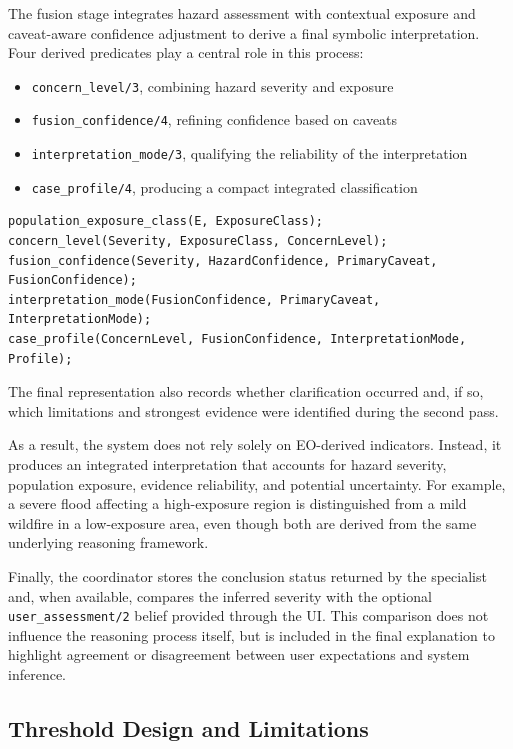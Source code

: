 \documentclass[12pt]{article}
\let\oldtexttt\texttt
\renewcommand{\texttt}[1]{{\fontsize{10.5}{12}\selectfont\oldtexttt{#1}}}
\begin{document}
The fusion stage integrates hazard assessment with contextual exposure and caveat-aware confidence adjustment to derive a final symbolic interpretation. Four derived predicates play a central role in this process:

\begin{itemize}
\item \texttt{concern\_level/3}, combining hazard severity and exposure
\item \texttt{fusion\_confidence/4}, refining confidence based on caveats
\item \texttt{interpretation\_mode/3}, qualifying the reliability of the interpretation
\item \texttt{case\_profile/4}, producing a compact integrated classification
\end{itemize}

\begin{lstlisting}
population_exposure_class(E, ExposureClass);
concern_level(Severity, ExposureClass, ConcernLevel);
fusion_confidence(Severity, HazardConfidence, PrimaryCaveat, FusionConfidence);
interpretation_mode(FusionConfidence, PrimaryCaveat, InterpretationMode);
case_profile(ConcernLevel, FusionConfidence, InterpretationMode, Profile);
\end{lstlisting}

The final representation also records whether clarification occurred and, if so, which limitations and strongest evidence were identified during the second pass.

As a result, the system does not rely solely on EO-derived indicators. Instead, it produces an integrated interpretation that accounts for hazard severity, population exposure, evidence reliability, and potential uncertainty. For example, a severe flood affecting a high-exposure region is distinguished from a mild wildfire in a low-exposure area, even though both are derived from the same underlying reasoning framework.

Finally, the coordinator stores the conclusion status returned by the specialist and, when available, compares the inferred severity with the optional \texttt{user\_assessment/2} belief provided through the UI. This comparison does not influence the reasoning process itself, but is included in the final explanation to highlight agreement or disagreement between user expectations and system inference.

\subsection{Threshold Design and Limitations}
\end{document}
